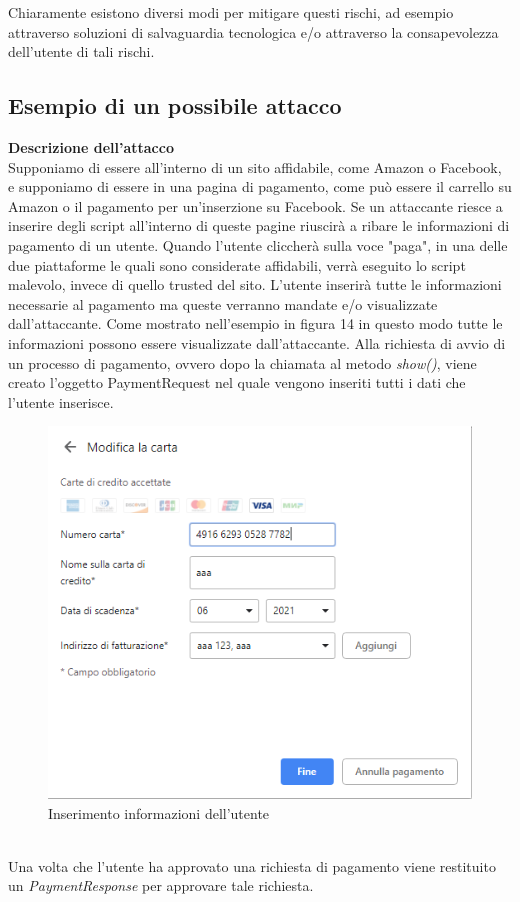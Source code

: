 \documentclass[11pt ,a4paper , twoside , openright ]{book}
\begin{document}
	Chiaramente esistono diversi modi per mitigare questi rischi, ad esempio attraverso soluzioni di salvaguardia tecnologica e/o attraverso la consapevolezza dell'utente di tali rischi.
	
	\subsection[Esempio di un possibile attacco]{Esempio di un possibile attacco \cite{rif18}} 
	\textbf{Descrizione dell'attacco}
	\\
	Supponiamo di essere all'interno di un sito affidabile, come Amazon o Facebook, e supponiamo di essere in una pagina di pagamento, come può essere il carrello su Amazon o il pagamento per un'inserzione su Facebook.
	Se un attaccante riesce a inserire degli script all'interno di queste pagine riuscirà a ribare le informazioni di pagamento di un utente.
	Quando l'utente cliccherà sulla voce "paga", in una delle due piattaforme le quali sono considerate affidabili, verrà eseguito lo script malevolo, invece di quello trusted del sito.
	L'utente inserirà tutte le informazioni necessarie al pagamento ma queste verranno mandate e/o visualizzate dall'attaccante.
	Come mostrato nell'esempio in figura 14 in questo modo tutte le informazioni possono essere visualizzate dall'attaccante.
	Alla richiesta di avvio di un processo di pagamento, ovvero dopo la chiamata al metodo \textit{show()}, viene creato l'oggetto PaymentRequest nel quale vengono inseriti tutti i dati che l'utente inserisce. 
	\begin{figure}[h]
		\centering
		\includegraphics[width=0.5\linewidth]{Chrome1}
		\caption{Inserimento informazioni dell'utente}
		\label{fig: Inserimento informazioni dell'utente}
	\end{figure}
	\\
	Una volta che l'utente ha approvato una richiesta di pagamento viene restituito un \textit{PaymentResponse} per approvare tale richiesta. 
\end{document}
